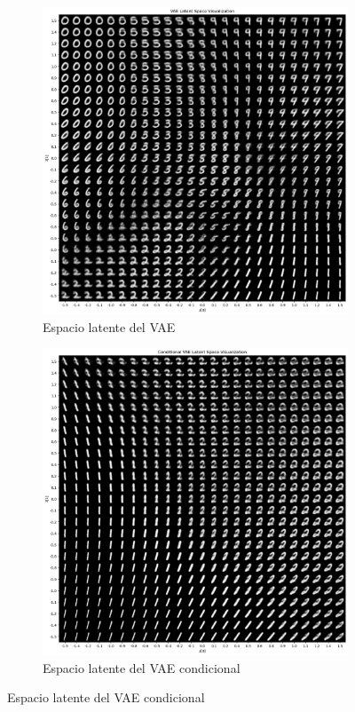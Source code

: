 \documentclass[11pt]{article}
\begin{document}
\begin{figure}[h]
\begin{subfigure}[h]{0.45\linewidth}
    \centering
    \includegraphics[width=\linewidth]{VAE/latent_space_vae.png}
    \caption{Espacio latente del VAE}
    \label{fig:vae_latent_space}
\end{subfigure}
\begin{subfigure}[h]{0.45\linewidth}
    \centering
    \includegraphics[width=\linewidth]{VAE/latent_space_cvae.png}
    \caption{Espacio latente del VAE condicional}
    \label{fig:cvae_latent_space}
\end{subfigure}
\end{figure}
\end{document}
